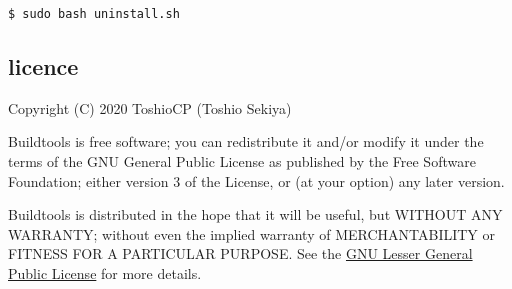 \begin{verbatim}
$ sudo bash uninstall.sh
\end{verbatim}

\hypertarget{licence}{%
\subsection{licence}\label{licence}}

Copyright (C) 2020 ToshioCP (Toshio Sekiya)

Buildtools is free software; you can redistribute it and/or modify it
under the terms of the GNU General Public License as published by the
Free Software Foundation; either version 3 of the License, or (at your
option) any later version.

Buildtools is distributed in the hope that it will be useful, but
WITHOUT ANY WARRANTY; without even the implied warranty of
MERCHANTABILITY or FITNESS FOR A PARTICULAR PURPOSE. See the
\href{https://www.gnu.org/licenses/gpl-3.0.html}{GNU Lesser General
Public License} for more details.

